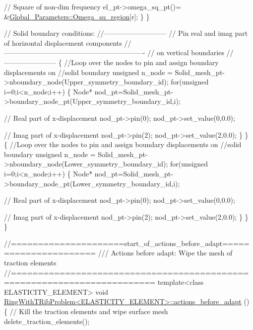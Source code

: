 \begin{DoxyCodeInclude}
     \textcolor{comment}{// Square of non-dim frequency}
     el\_pt->omega\_sq\_pt()= &\hyperlink{namespaceGlobal__Parameters_a58a76124a7c047adf58388cc12e84f23}{Global\_Parameters::Omega\_sq\_region}[r];
    \}
  \}                         


 \textcolor{comment}{// Solid boundary conditions:}
 \textcolor{comment}{//---------------------------}
 \textcolor{comment}{// Pin real and imag part of horizontal displacement components }
 \textcolor{comment}{//-------------------------------------------------------------}
 \textcolor{comment}{// on vertical boundaries}
 \textcolor{comment}{//-----------------------}
 \{  
  \textcolor{comment}{//Loop over the nodes to pin and assign boundary displacements on }
  \textcolor{comment}{//solid boundary}
  \textcolor{keywordtype}{unsigned} n\_node = Solid\_mesh\_pt->nboundary\_node(Upper\_symmetry\_boundary\_id);
  \textcolor{keywordflow}{for}(\textcolor{keywordtype}{unsigned} i=0;i<n\_node;i++)
   \{
    Node* nod\_pt=Solid\_mesh\_pt->boundary\_node\_pt(Upper\_symmetry\_boundary\_id,i);
    
    \textcolor{comment}{// Real part of x-displacement }
    nod\_pt->pin(0);
    nod\_pt->set\_value(0,0.0);
    
    \textcolor{comment}{// Imag part of x-displacement}
    nod\_pt->pin(2);
    nod\_pt->set\_value(2,0.0);
   \}
 \}
 \{
  \textcolor{comment}{//Loop over the nodes to pin and assign boundary displacements on }
  \textcolor{comment}{//solid boundary}
  \textcolor{keywordtype}{unsigned} n\_node = Solid\_mesh\_pt->nboundary\_node(Lower\_symmetry\_boundary\_id);
  \textcolor{keywordflow}{for}(\textcolor{keywordtype}{unsigned} i=0;i<n\_node;i++)
   \{
    Node* nod\_pt=Solid\_mesh\_pt->boundary\_node\_pt(Lower\_symmetry\_boundary\_id,i);

    \textcolor{comment}{// Real part of x-displacement }
    nod\_pt->pin(0);
    nod\_pt->set\_value(0,0.0);
    
    \textcolor{comment}{// Imag part of x-displacement}
    nod\_pt->pin(2);
    nod\_pt->set\_value(2,0.0);
   \}
 \}
\}



\textcolor{comment}{//=====================start\_of\_actions\_before\_adapt======================}\textcolor{comment}{}
\textcolor{comment}{/// Actions before adapt: Wipe the mesh of traction elements}
\textcolor{comment}{}\textcolor{comment}{//========================================================================}
\textcolor{keyword}{template}<\textcolor{keyword}{class} ELASTICITY\_ELEMENT>
\textcolor{keywordtype}{void} \hyperlink{classRingWithTRibProblem_a7a170199d58390ae43a044294bfc7ac5}{RingWithTRibProblem<ELASTICITY\_ELEMENT>::actions\_before\_adapt}
      ()
\{
 \textcolor{comment}{// Kill the traction elements and wipe surface mesh}
 delete\_traction\_elements();
 

\end{DoxyCodeInclude}
